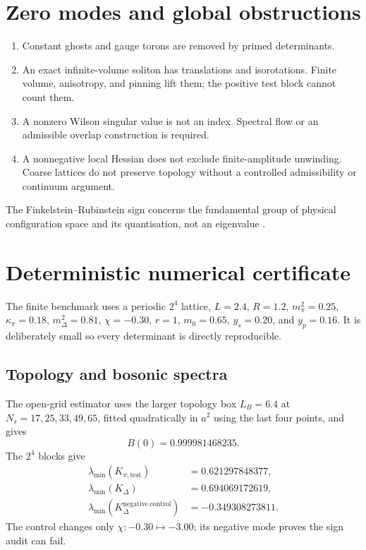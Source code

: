 \documentclass[11pt]{article}
\theoremstyle{definition}
\theoremstyle{remark}
\begin{document}
\section{Zero modes and global obstructions}

\begin{enumerate}[label=(Z\arabic*)]
\item Constant ghosts and gauge torons are removed by primed determinants.
\item An exact infinite-volume soliton has translations and isorotations.
  Finite volume, anisotropy, and pinning lift them; the positive test block
  cannot count them.
\item A nonzero Wilson singular value is not an index.  Spectral flow or an
  admissible overlap construction is required.
\item A nonnegative local Hessian does not exclude finite-amplitude
  unwinding.  Coarse lattices do not preserve topology without a controlled
  admissibility or continuum argument.
\end{enumerate}
The Finkelstein--Rubinstein sign concerns the fundamental group of physical
configuration space and its quantisation, not an eigenvalue
\cite{FinkelsteinRubinstein1968}.

\section{Deterministic numerical certificate}

The finite benchmark uses a periodic \(2^4\) lattice, \(L=2.4\), \(R=1.2\),
\(m_\pi^2=0.25\), \(\kappa_\pi=0.18\), \(m_\Delta^2=0.81\),
\(\chi=-0.30\), \(r=1\), \(m_0=0.65\), \(y_s=0.20\), and \(y_p=0.16\).
It is deliberately small so every determinant is directly reproducible.

\subsection{Topology and bosonic spectra}

The open-grid estimator uses the larger topology box \(L_B=6.4\) at
\(N_s=17,25,33,49,65\), fitted quadratically in \(a^2\) using the last
four points, and gives
\[
 B(0)=0.999981468235.
\]
The \(2^4\) blocks give
\begin{align}
 \lambda_{\min}(K_{\pi,\mathrm{test}})&=0.621297848377,\nonumber\\
 \lambda_{\min}(K_\Delta)&=0.694069172619,\nonumber\\
 \lambda_{\min}(K_\Delta^{\mathrm{negative\ control}})
 &=-0.349308273811.
 \label{eq:numbers-boson}
\end{align}
The control changes only \(\chi:-0.30\mapsto-3.00\); its negative mode
proves the sign audit can fail.
\end{document}

